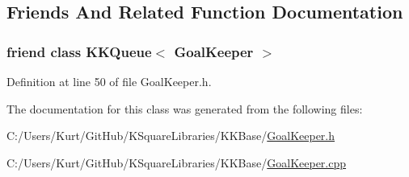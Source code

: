 \subsection{Friends And Related Function Documentation}
\subsubsection[{\texorpdfstring{K\+K\+Queue$<$ Goal\+Keeper $>$}{KKQueue< GoalKeeper >}}]{\setlength{\rightskip}{0pt plus 5cm}friend class {\bf K\+K\+Queue}$<$ {\bf Goal\+Keeper} $>$\hspace{0.3cm}{\ttfamily [friend]}}\hypertarget{class_k_k_b_1_1_goal_keeper_a5193b500dc09bd87a7d54ba00e25d191}{}\label{class_k_k_b_1_1_goal_keeper_a5193b500dc09bd87a7d54ba00e25d191}


Definition at line 50 of file Goal\+Keeper.\+h.



The documentation for this class was generated from the following files\+:\begin{DoxyCompactItemize}
\item 
C\+:/\+Users/\+Kurt/\+Git\+Hub/\+K\+Square\+Libraries/\+K\+K\+Base/\hyperlink{_goal_keeper_8h}{Goal\+Keeper.\+h}\item 
C\+:/\+Users/\+Kurt/\+Git\+Hub/\+K\+Square\+Libraries/\+K\+K\+Base/\hyperlink{_goal_keeper_8cpp}{Goal\+Keeper.\+cpp}\end{DoxyCompactItemize}
